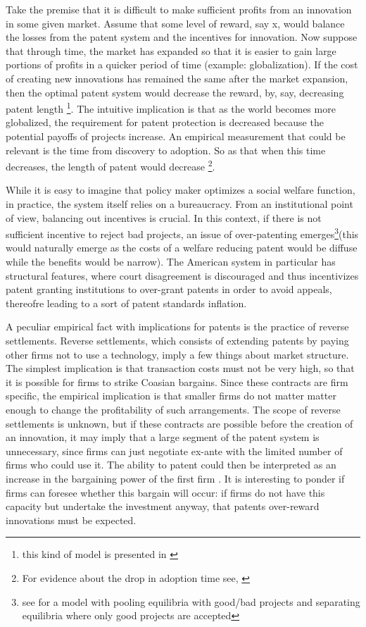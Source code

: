 \documentclass[12pt]{report}
\numberwithin{equation}{section}
\begin{document}
Take the premise that it is difficult to make sufficient profits from an innovation in some given market. Assume that some level of reward, say x, would balance the losses from the patent system and the incentives for innovation. Now suppose that through time, the market has expanded so that it is easier to gain large portions of profits in a quicker period of time (example: globalization). If the cost of creating new innovations has remained the same after the market expansion, then the optimal patent system would decrease the reward, by, say, decreasing patent length \footnote{this kind of model is presented in \cite{boldrin2009market} }. The intuitive implication is that as the world becomes more globalized, the requirement for patent protection is decreased because the potential payoffs of projects increase. An empirical measurement that could be relevant is the time from discovery to adoption. So as that when this time decreases, the length of patent would decrease \footnote{For evidence about the drop in adoption time see, \cite{comin2006five}}. 

While it is easy to imagine that policy maker optimizes a social welfare function, in practice, the system itself relies on a bureaucracy. From an institutional point of view, balancing out incentives is crucial. In this context, if there is not sufficient incentive to reject bad projects, an issue of over-patenting emerges\footnote{see \cite{Caillaud2012} for a model with pooling equilibria with good/bad projects and separating equilibria where only good projects are accepted}(this would naturally emerge as the costs of a welfare reducing patent would be diffuse while the benefits would be narrow). The American system in particular has structural features, where court disagreement is discouraged and thus incentivizes patent granting institutions to over-grant patents in order to avoid appeals, thereofre leading to a sort of patent standards inflation. \citep{Masur2011}

A peculiar empirical fact with implications for patents is the practice of reverse settlements. Reverse settlements, which consists of extending patents by paying other firms not to use a technology, imply a few things about market structure. The simplest implication is that transaction costs must not be very high, so that it is possible for firms to strike Coasian bargains. Since these contracts are firm specific, the empirical implication is that smaller firms do not matter matter enough to change the profitability of such arrangements. The scope of reverse settlements is unknown, but if these contracts are possible before the creation of an innovation, it may imply that a large segment of the patent system is unnecessary, since firms can just negotiate ex-ante with the limited number of firms who could use it. The ability to patent could then be interpreted as an increase in the bargaining power of the first firm \citep{Green1995}. It is interesting to ponder if firms can foresee whether this bargain will occur: if firms do not have this capacity but undertake the investment anyway, that patents over-reward innovations must be expected. 
\end{document}
